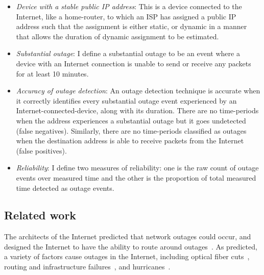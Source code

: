 \begin{itemize}

\item {\emph{Device with a stable public IP address}: This is a device
    connected to the Internet, like a
home-router, to which an ISP has assigned a public IP address such
that the
assignment is either static, or dynamic in a manner that allows the
duration of dynamic assignment to be estimated.}

\item {\emph{Substantial outage}: I define a substantial outage to be an event where a device
    with an Internet connection is unable to send or receive any
    packets for at least 10 minutes.}

\item {\emph{Accuracy of outage detection}: An outage detection technique is accurate when it
correctly identifies every substantial outage event experienced by an Internet-connected-device, along with its
duration. There are no time-periods when the address
experiences a substantial outage but it goes undetected (false
negatives). Similarly, there are no time-periods classified as
outages when the destination address is able to receive packets from the
Internet (false positives).}

\item {\emph{Reliability}: I define two measures of reliability: one is the raw count of outage
events over measured time and the other is the proportion of total measured time
detected as outage events.} %

\end{itemize}

\subsection{Related work}

The architects of the Internet predicted that network outages could
occur, and designed the Internet to have the ability to route around
outages~\cite{clark-darpa}. As predicted, a variety of factors cause
outages in the Internet, including optical fiber
cuts~\cite{fiber-cuts}, routing and infrastructure
failures~\cite{backbone-failures-1999, ratulbgp}, and
hurricanes~\cite{pingin}.

